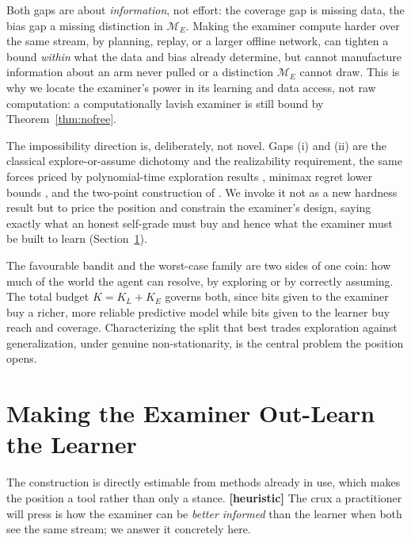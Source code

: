 \documentclass[10pt]{article} %
\theoremstyle{definition}
\theoremstyle{plain}
\newcommand{\ModE}{\mathcal{M}_E}
\begin{document}
Both gaps are about \emph{information}, not effort: the coverage gap is missing data, the bias gap a missing distinction in $\ModE$. Making the examiner compute harder over the same stream, by planning, replay, or a larger offline network, can tighten a bound \emph{within} what the data and bias already determine, but cannot manufacture information about an arm never pulled or a distinction $\ModE$ cannot draw. This is why we locate the examiner's power in its learning and data access, not raw computation: a computationally lavish examiner is still bound by Theorem~\ref{thm:nofree}.

The impossibility direction is, deliberately, not novel. Gaps (i) and (ii) are the classical explore-or-assume dichotomy and the realizability requirement, the same forces priced by polynomial-time exploration results \citep{kearns2002e3,brafman2002rmax}, minimax regret lower bounds \citep{azar2017minimax}, and the two-point construction of \citet{lai1985asymptotically}. We invoke it not as a new hardness result but to price the position and constrain the examiner's design, saying exactly what an honest self-grade must buy and hence what the examiner must be built to learn (Section~\ref{sec:practical}).

The favourable bandit and the worst-case family are two sides of one coin: how much of the world the agent can resolve, by exploring or by correctly assuming. The total budget $K = K_L + K_E$ governs both, since bits given to the examiner buy a richer, more reliable predictive model while bits given to the learner buy reach and coverage. Characterizing the split that best trades exploration against generalization, under genuine non-stationarity, is the central problem the position opens.

\section{Making the Examiner Out-Learn the Learner}
\label{sec:practical}

The construction is directly estimable from methods already in use, which makes the position a tool rather than only a stance. \textbf{[heuristic]} The crux a practitioner will press is how the examiner can be \emph{better informed} than the learner when both see the same stream; we answer it concretely here.
\end{document}
